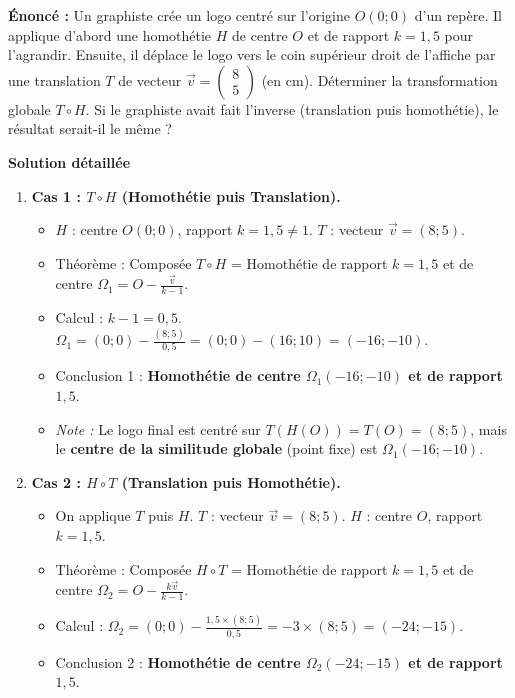 \documentclass[11pt]{article}
\begin{document}
\begin{exoresolu}
\textbf{Énoncé :} Un graphiste crée un logo centré sur l'origine $O(0;0)$ d'un repère. Il applique d'abord une homothétie $H$ de centre $O$ et de rapport $k = 1,5$ pour l'agrandir. Ensuite, il déplace le logo vers le coin supérieur droit de l'affiche par une translation $T$ de vecteur $\vec{v} = \begin{pmatrix} 8 \\ 5 \end{pmatrix}$ (en cm). Déterminer la transformation globale $T \circ H$. Si le graphiste avait fait l'inverse (translation puis homothétie), le résultat serait-il le même ?

\textbf{Solution détaillée}
\begin{enumerate}
    \item \textbf{Cas 1 : $T \circ H$ (Homothétie puis Translation).}
    \begin{itemize}
        \item $H$ : centre $O(0;0)$, rapport $k=1,5 \neq 1$. $T$ : vecteur $\vec{v} = (8;5)$.
        \item Théorème : Composée $T \circ H$ = Homothétie de rapport $k=1,5$ et de centre $\Omega_1 = O - \frac{\vec{v}}{k-1}$.
        \item Calcul : $k-1 = 0,5$. $\Omega_1 = (0;0) - \frac{(8;5)}{0,5} = (0;0) - (16;10) = (-16;-10)$.
        \item Conclusion 1 : \textbf{Homothétie de centre $\Omega_1(-16;-10)$ et de rapport $1,5$}.
        \item \textit{Note :} Le logo final est centré sur $T(H(O)) = T(O) = (8;5)$, mais le \textbf{centre de la similitude globale} (point fixe) est $\Omega_1(-16;-10)$.
    \end{itemize}
    \item \textbf{Cas 2 : $H \circ T$ (Translation puis Homothétie).}
    \begin{itemize}
        \item On applique $T$ puis $H$. $T$ : vecteur $\vec{v} = (8;5)$. $H$ : centre $O$, rapport $k=1,5$.
        \item Théorème : Composée $H \circ T$ = Homothétie de rapport $k=1,5$ et de centre $\Omega_2 = O - \frac{k\vec{v}}{k-1}$.
        \item Calcul : $\Omega_2 = (0;0) - \frac{1,5 \times (8;5)}{0,5} = -3 \times (8;5) = (-24;-15)$.
        \item Conclusion 2 : \textbf{Homothétie de centre $\Omega_2(-24;-15)$ et de rapport $1,5$}.

\end{itemize}
\end{enumerate}
\end{exoresolu}
\end{document}
